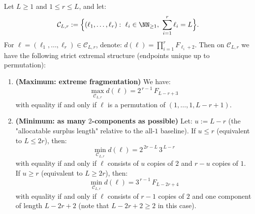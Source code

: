 \begin{proposition}\label{prop:pom-multiplicity-fixed-r-extrema}
Let $L\ge 1$ and $1\le r\le L$, and let:
\[
\mathcal{C}_{L,r}:=\Bigl\{(\ell_1,\dots,\ell_r):\ \ell_i\in\NN_{\ge 1},\ \sum_{i=1}^r\ell_i=L\Bigr\}.
\]
For $\boldsymbol{\ell}=(\ell_1,\dots,\ell_r)\in\mathcal{C}_{L,r}$, denote:
\(
d(\boldsymbol{\ell})=\prod_{i=1}^r F_{\ell_i+2}
\).
Then on $\mathcal{C}_{L,r}$ we have the following strict extremal structure (endpoints unique up to permutation):
\begin{enumerate}
  \item \textbf{(Maximum: extreme fragmentation)} We have:
  \begin{equation}\label{eq:pom-multiplicity-fixed-r-max}
  \boxed{\;\max_{\mathcal{C}_{L,r}} d(\boldsymbol{\ell})=2^{\,r-1}\,F_{L-r+3}\;}
  \end{equation}
  with equality if and only if $\boldsymbol{\ell}$ is a permutation of $(1,\dots,1,L-r+1)$.
  \item \textbf{(Minimum: as many $2$-components as possible)} Let:
  \(
  u:=L-r
  \)
  (the "allocatable surplus length" relative to the all-$1$ baseline).
  If $u\le r$ (equivalent to $L\le 2r$), then:
  \begin{equation}\label{eq:pom-multiplicity-fixed-r-min-short}
  \boxed{\;\min_{\mathcal{C}_{L,r}} d(\boldsymbol{\ell})=2^{\,2r-L}\,3^{\,L-r}\;}
  \end{equation}
  with equality if and only if $\boldsymbol{\ell}$ consists of $u$ copies of $2$ and $r-u$ copies of $1$.
  If $u\ge r$ (equivalent to $L\ge 2r$), then:
  \begin{equation}\label{eq:pom-multiplicity-fixed-r-min-long}
  \boxed{\;\min_{\mathcal{C}_{L,r}} d(\boldsymbol{\ell})=3^{\,r-1}\,F_{L-2r+4}\;}
  \end{equation}
  with equality if and only if $\boldsymbol{\ell}$ consists of $r-1$ copies of $2$ and one component of length $L-2r+2$ (note that $L-2r+2\ge 2$ in this case).
\end{enumerate}
\end{proposition}

